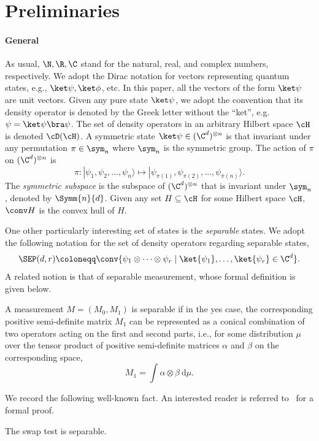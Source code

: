 \section{Preliminaries} \label{sec:prelim}

\paragraph{General}
As usual, $\N, \R, \C $ stand for the natural, real, and complex numbers, respectively. %
%
We adopt the Dirac notation for vectors representing quantum states, e.g., $\ket\psi, \ket\phi$, etc. In this paper, all the vectors of the form $\ket\psi$ are unit vectors. Given any pure state $\ket\psi$, we adopt the convention that its density operator is denoted by the Greek letter without the ``ket'', e.g. $\psi = \ket\psi\bra\psi$. The set of density operators in an arbitrary Hilbert space $\cH$ is denoted $\cD(\cH)$.
A symmetric state $\ket\psi \in (\C^d)^{\otimes n}$ is that invariant under any permutation $\pi\in \sym_n$ where $\sym_n$ is the symmetric group. The action of $\pi$ on $(\C^d)^{\otimes n}$ is  
\[
\pi:|\psi_1, \psi_2, \ldots, \psi_n\rangle
\mapsto |\psi_{\pi(1)}, \psi_{\pi(2)}, \ldots, \psi_{\pi(n)} \rangle.
\]
The \emph{symmetric subspace} is the subspace of $(\C^d)^{\otimes n}$ that is invariant under $\sym_n$, denoted by $\Symm{n}{d}$. Given any set $H\subseteq \cH$ for some Hilbert space $\cH$, $\conv H$ is the convex hull of $H$. 

One other particularly interesting set of states is the \emph{separable} states. We adopt the following notation for the set of density operators regarding separable states,
\begin{align*}
  \SEP(d,r) \coloneqq \conv{\psi_1 \otimes \cdots \otimes \psi_r \mid \ket{\psi_1},\ldots,\ket{\psi_r} \in \C^d}.
\end{align*}
A related notion is that of separable measurement, whose formal definition is given below.
\begin{definition}
A measurement $M = (M_0, M_1)$ is separable if in the yes case, the corresponding positive semi-definite matrix $M_1$ can be represented as a conical combination of two operators acting on the first and second parts, i.e.,
for some distribution $\mu$ over the tensor product of positive semi-definite matrices $\alpha$ and $\beta$ on the corresponding space,
\[
M_1 = \int  \alpha \otimes \beta ~\mathrm{d}\mu.
\]
\end{definition}
We record the following well-known fact. An interested reader is referred to~\cite{harrow2013church} for a formal proof.
\begin{fact}[Folklore] \label{fact:swap-test-sep}
The swap test is separable.
\end{fact}



